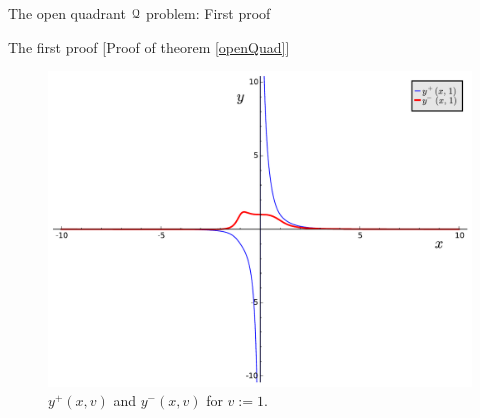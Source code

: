 \documentclass[11pt, a4paper, english, twoside, notitlepage, openright]{report}
\begin{document}
\begin{chapter}{The open quadrant $\mathcal{Q}$ problem: First proof}
\begin{section}{The first proof} [Proof of theorem \ref{openQuad}]
\begin{figure}[h]
\includegraphics[width=1\textwidth]{plots/ch1_07_sols_1.pdf}
\caption{$y^+(x,v)$ and $y^-(x,v)$ for $v:=1$.\label{fig:plotYs_2}}
\end{figure}


\end{section}
\end{chapter}
\end{document}
